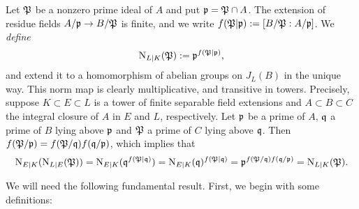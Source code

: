 Let $\mathfrak{P}$ be a nonzero prime ideal of $A$ and put $\mathfrak{p} = \mathfrak{P} \cap A$.
The extension of residue fields $A/\mathfrak{p} \to B/\mathfrak{P}$ is finite, and we write $f(\mathfrak{P}|\mathfrak{p}) := [B/\mathfrak{P} : A/\mathfrak{p}]$.
We \emph{define}
\[ \operatorname{N}_{L|K}(\mathfrak{P}) := \mathfrak{p}^{f(\mathfrak{P}|\mathfrak{p})}, \]
and extend it to a homomorphism of abelian groups on $J_{L}(B)$ in the unique way.
This norm map is clearly multiplicative, and transitive in towers.
Precisely, suppose $K \subset E \subset L$ is a tower of finite separable field extensions and $A \subset B \subset C$ the integral closure of $A$ in $E$ and $L$, respectively.
Let $\mathfrak{p}$ be a prime of $A$, $\mathfrak{q}$ a prime of $B$ lying above $\mathfrak{p}$ and $\mathfrak{P}$ a prime of $C$ lying above $\mathfrak{q}$.
Then $f(\mathfrak{P} / \mathfrak{p}) = f(\mathfrak{P} / \mathfrak{q}) f(\mathfrak{q} / \mathfrak{p})$, which implies that
\[\operatorname{N}_{E|K}(\operatorname{N}_{L|E}(\mathfrak{P})) = \operatorname{N}_{E|K}(\mathfrak{q}^{f(\mathfrak{P}|\mathfrak{q})}) = \operatorname{N}_{E|K}(\mathfrak{q})^{f(\mathfrak{P}|\mathfrak{q})} = \mathfrak{p}^{f(\mathfrak{P} / \mathfrak{q}) f(\mathfrak{q} / \mathfrak{p})} = \operatorname{N}_{L|K}(\mathfrak{P}).\]

We will need the following fundamental result. First, we begin with some definitions:

